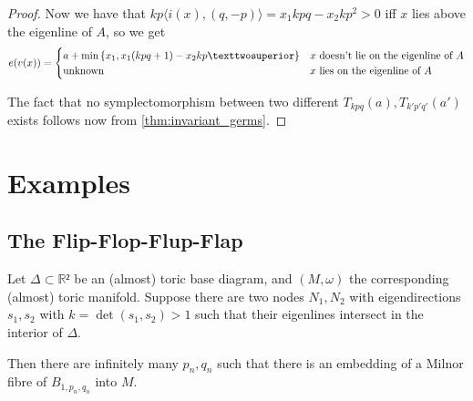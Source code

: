 \documentclass[12pt,a4paper,draft]{scrartcl}
\begin{document}
\begin{proof}
  Now we have that $kp⟨i(x),(q,-p)⟩ = x_1 kpq - x_2 kp^2 > 0$ iff $x$ lies above the eigenline of $A$, so we get
  \[e(v(x)) = \begin{cases}
    a + \min\qty{x_1,x_1(kpq+1) - x_2kp²} & \text{$x$ doesn't lie on the eigenline of $A$}\\
    \text{unknown} & \text{$x$ lies on the eigenline of $A$}\\
  \end{cases}\]

  The fact that no symplectomorphism between two different $T_{kpq}(a), T_{k'p'q'}(a')$ exists follows now from \cref{thm:invariant_germs}.
\end{proof}

\section{Examples}

\subsection{The Flip-Flop-Flup-Flap}


\begin{proposition}
  Let $Δ ⊂ ℝ²$ be an (almost) toric base diagram, and $(M,ω)$ the corresponding (almost) toric manifold.
Suppose there are two nodes $N_1,N_2$ with eigendirections $s_1,s_2$ with $k = \det(s_1,s_2)>1$ such that their eigenlines intersect in the interior of $Δ$.

Then there are infinitely many $p_n,q_n$ such that there is an embedding of a Milnor fibre of $B_{1,p_n,q_n}$ into $M$.
\end{proposition}
\end{document}
